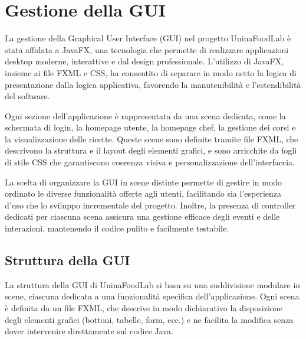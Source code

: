\section{Gestione della GUI}

La gestione della Graphical User Interface (GUI) nel progetto UninaFoodLab è stata affidata a JavaFX, una tecnologia che permette di realizzare applicazioni desktop moderne, interattive e dal design professionale. L'utilizzo di JavaFX, insieme ai file FXML e CSS, ha consentito di separare in modo netto la logica di presentazione dalla logica applicativa, favorendo la manutenibilità e l'estendibilità del software.

Ogni sezione dell'applicazione è rappresentata da una scena dedicata, come la schermata di login, la homepage utente, la homepage chef, la gestione dei corsi e la visualizzazione delle ricette. Queste scene sono definite tramite file FXML, che descrivono la struttura e il layout degli elementi grafici, e sono arricchite da fogli di stile CSS che garantiscono coerenza visiva e personalizzazione dell'interfaccia.

La scelta di organizzare la GUI in scene distinte permette di gestire in modo ordinato le diverse funzionalità offerte agli utenti, facilitando sia l'esperienza d'uso che lo sviluppo incrementale del progetto. Inoltre, la presenza di controller dedicati per ciascuna scena assicura una gestione efficace degli eventi e delle interazioni, mantenendo il codice pulito e facilmente testabile.

\subsection{Struttura della GUI}

La struttura della GUI di UninaFoodLab si basa su una suddivisione modulare in scene, ciascuna dedicata a una funzionalità specifica dell’applicazione. Ogni scena è definita da un file FXML, che descrive in modo dichiarativo la disposizione degli elementi grafici (bottoni, tabelle, form, ecc.) e ne facilita la modifica senza dover intervenire direttamente sul codice Java.

